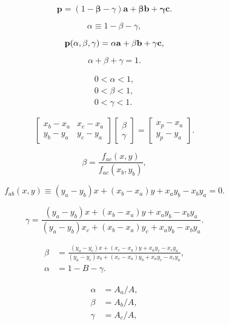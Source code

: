 \documentclass[lang=cn,12pt]{elegantbook}
\begin{document}
$$
  \mathbf{p}=(1-{\boldsymbol{\beta}}-\gamma)\mathbf{a}+{\boldsymbol{\beta}}\mathbf{b}+{\boldsymbol{\gamma}}\mathbf{c}.
$$

$$
  \alpha\equiv1-\beta-\gamma,
$$

\begin{equation}
  {\bf p}(\alpha,\beta,\gamma)=\alpha{\bf a}+\beta{\bf b}+\gamma{\bf c},
\end{equation}

\begin{equation}
  \alpha+\beta+\gamma=1.
\end{equation}

$$
  \begin{array}{c}{{0<\alpha<1,}}\\ {{0<\beta<1,}}\\ {{0<\gamma<1.}}\end{array}
$$

\begin{equation}
  \begin{bmatrix}
    x_b-x_a & x_c-x_a \\
    y_b-y_a & y_c-y_a
  \end{bmatrix}
  \begin{bmatrix}
    \beta \\
    \gamma
  \end{bmatrix}=
  \begin{bmatrix}
    x_p-x_a \\
    y_p-y_a
  \end{bmatrix}.
\end{equation}

\begin{equation}
  \beta=\frac{f_{a c}(x,y)}{f_{a c}(x_{b},y_{b})},
\end{equation}

$$
  f_{a b}(x,y)\equiv(y_{a}-y_{b})x+(x_{b}-x_{a})y+x_{a}y_{b}-x_{b}y_{a}=0.
$$

$$
  \gamma=\frac{(y_{a}-y_{b})x+(x_{b}-x_{a})y+x_{a}y_{b}-x_{b}y_{a}}{(y_{a}-y_{b})x_{c}+(x_{b}-x_{a})y_{c}+x_{a}y_{b}-x_{b}y_{a}}.
$$

$$
  \begin{aligned}
    \beta  & =\frac{(y_{a}-y_{c})x+(x_{c}-x_{a})y+x_{a}y_{c}-x_{c}y_{a}}{(y_{a}-y_{c})x_{b}+(x_{c}-x_{a})y_{b}+x_{a}y_{c}-x_{c}y_{a}}, \\
    \alpha & =1-B-\gamma.
  \end{aligned}
$$

\begin{equation}
  \begin{aligned}
    \alpha & =A_{a}/A, \\
    \beta  & =A_{b}/A, \\
    \gamma & =A_{c}/A,
  \end{aligned}
\end{equation}
\end{document}
